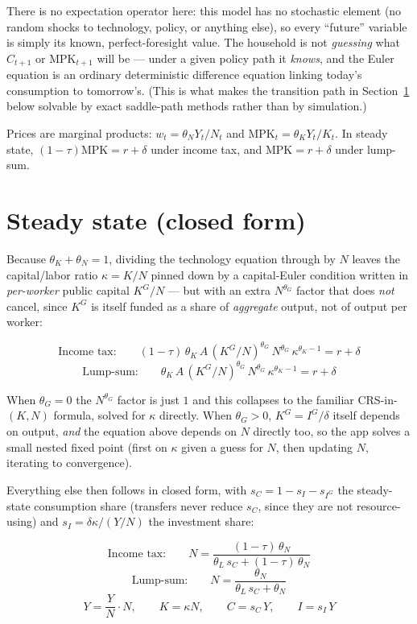 \documentclass[11pt]{article}
\newcommand{\eq}[1]{\begin{equation}#1\end{equation}}
\begin{document}
There is no expectation operator here: this model has no stochastic
element (no random shocks to technology, policy, or anything else), so
every ``future'' variable is simply its known, perfect-foresight value.
The household is not \emph{guessing} what $C_{t+1}$ or $\mathrm{MPK}_{t+1}$
will be --- under a given policy path it \emph{knows}, and the Euler
equation is an ordinary deterministic difference equation linking today's
consumption to tomorrow's. (This is what makes the transition path in
Section~\ref{sec:steadystate} below solvable by exact saddle-path methods
rather than by simulation.)

Prices are marginal products: $w_t=\theta_N Y_t/N_t$ and
$\mathrm{MPK}_t=\theta_K Y_t/K_t$. In steady state, $(1-\tau)\mathrm{MPK}=r+\delta$
under income tax, and $\mathrm{MPK}=r+\delta$ under lump-sum.

\section{Steady state (closed form)}
\label{sec:steadystate}

Because $\theta_K+\theta_N=1$, dividing the technology equation through by
$N$ leaves the capital/labor ratio $\kappa=K/N$ pinned down by a
capital-Euler condition written in \emph{per-worker} public capital
$K^G/N$ --- but with an extra $N^{\theta_G}$ factor that does \emph{not}
cancel, since $K^G$ is itself funded as a share of \emph{aggregate} output,
not of output per worker:

\eq{ \text{Income tax:}\qquad (1-\tau)\,\theta_K\,A\,(K^G/N)^{\theta_G}\,N^{\theta_G}\,\kappa^{\theta_K-1} = r+\delta }
\eq{ \text{Lump-sum:}\qquad \theta_K\,A\,(K^G/N)^{\theta_G}\,N^{\theta_G}\,\kappa^{\theta_K-1} = r+\delta }

When $\theta_G=0$ the $N^{\theta_G}$ factor is just $1$ and this collapses
to the familiar CRS-in-$(K,N)$ formula, solved for $\kappa$ directly. When
$\theta_G>0$, $K^G=I^G/\delta$ itself depends on output, \emph{and} the
equation above depends on $N$ directly too, so the app solves a small
nested fixed point (first on $\kappa$ given a guess for $N$, then updating
$N$, iterating to convergence).

Everything else then follows in closed form, with
$s_C=1-s_I-s_{I^G}$ the steady-state consumption share (transfers never
reduce $s_C$, since they are not resource-using) and $s_I=\delta\kappa/(Y/N)$
the investment share:

\eq{ \text{Income tax:}\qquad N = \frac{(1-\tau)\,\theta_N}{\theta_L\,s_C + (1-\tau)\,\theta_N} }
\eq{ \text{Lump-sum:}\qquad N = \frac{\theta_N}{\theta_L\,s_C + \theta_N} }
\eq{ Y=\frac{Y}{N}\cdot N,\qquad K=\kappa N,\qquad C=s_C\,Y,\qquad I=s_I\,Y }
\end{document}

